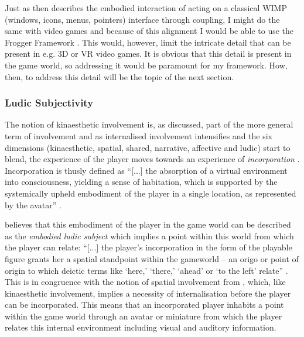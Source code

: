 Just as  then describes the embodied interaction of acting on a classical WIMP (windows, icons, menus, pointers) interface through coupling, I might do the same with video games and because of this alignment I would be able to use the Frogger Framework \cite{frogger}. This would, however, limit the intricate detail that can be present in e.g. 3D or VR video games. It is obvious that this detail is present in the game world, so addressing it would be paramount for my framework. How, then, to address this detail will be the topic of the next section.

\subsubsection{Ludic Subjectivity}
The notion of kinaesthetic involvement is, as discussed, part of the more general term of involvement and as internalised involvement intensifies and the six dimensions (kinaesthetic, spatial, shared, narrative, affective and ludic) start to blend, the experience of the player moves towards an experience of \textit{incorporation} \cite{calleja}. Incorporation is thusly defined as ``[...] the absorption of a virtual environment into consciousness, yielding a sense of habitation, which is supported by the systemically upheld embodiment of the player in a single location, as represented by the avatar'' \cite[p. 169]{calleja}.

 believes that this embodiment of the player in the game world can be described as the \textit{embodied ludic subject} which implies a point within this world from which the player can relate: ``[...] the player’s incorporation in the form of the playable figure grants her a spatial standpoint within the gameworld – an origo or point of origin to which deictic terms like ‘here,’ ‘there,’ ‘ahead’ or ‘to the left’ relate'' \cite[p. 4]{vellashort}. This is in congruence with the notion of spatial involvement from , which, like kinaesthetic involvement, implies a necessity of internalisation before the player can be incorporated. This means that an incorporated player inhabits a point within the game world through an avatar or miniature from which the player relates this internal environment including visual and auditory information.

